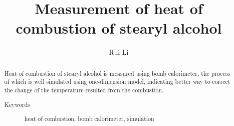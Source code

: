 \documentclass[%
 reprint,
 amsmath,amssymb,
 aps,
10.5pt,
]{revtex4-1}
\begin{document}

\title{Measurement of heat of combustion of stearyl alcohol}%

\author{Rui Li}
%





\begin{abstract}
Heat of combustion of stearyl alcohol is measured using bomb calorimeter, the process of which is well simulated using one-dimension model, indicating better way to correct the change of the temperature resulted from the combustion.
\begin{description}
\item[Keywords]
heat of combustion, bomb calorimeter, simulation
\end{description}
\end{abstract}

\maketitle
\end{document}
